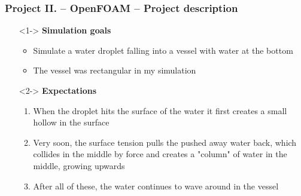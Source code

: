 \begin{frame}
\frametitle{Project II. -- OpenFOAM -- Project description}

\begin{itemize}
	\item[]<1-> \textbf{Simulation goals}
	\begin{itemize}
		\item<1-> Simulate a water droplet falling into a vessel with water at the bottom
		\item<1-> The vessel was rectangular in my simulation
	\end{itemize}
	\item[]<2-> \textbf{Expectations}
	\begin{enumerate}
		\item<2-> When the droplet hits the surface of the water it first creates a small hollow in the surface
		\item<2-> Very soon, the surface tension pulls the pushed away water back, which collides in the middle by force and creates a "column" of water in the middle, growing upwards
		\item<2> After all of these, the water continues to wave around in the vessel
	\end{enumerate}
\end{itemize}

\end{frame}
